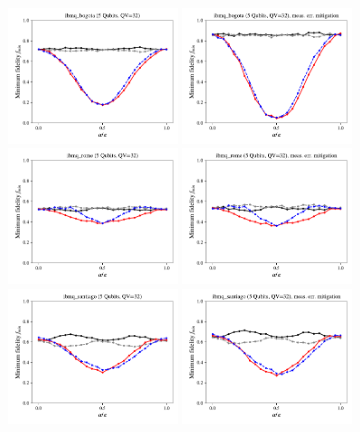 \documentclass[a4paper]{article}
\begin{document}
\begin{figure}[H]
	\centering
	\includegraphics[width=0.4\textwidth]{fmin_qc8_mit1}
	\includegraphics[width=0.4\textwidth]{fmin_qc8_mit0}
	\includegraphics[width=0.4\textwidth]{fmin_qc9_mit1}
	\includegraphics[width=0.4\textwidth]{fmin_qc9_mit0}
	\includegraphics[width=0.4\textwidth]{fmin_qc10_mit1}
	\includegraphics[width=0.4\textwidth]{fmin_qc10_mit0}
\end{figure}
\end{document}
